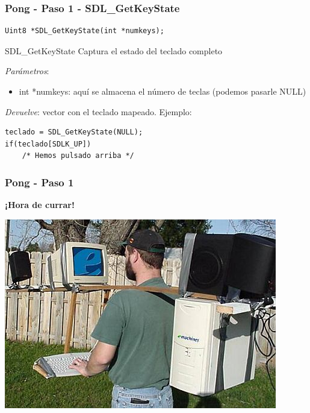 \begin{frame}[fragile]
    \frametitle{Pong - Paso 1 - SDL\_GetKeyState}
	
\begin{verbatim}
Uint8 *SDL_GetKeyState(int *numkeys);
\end{verbatim}

    \begin{block}{SDL\_GetKeyState}
	Captura el estado del teclado completo
	
	\emph{Parámetros}:
	\begin{itemize}
	    \item int *numkeys: aquí se almacena el número de teclas (podemos pasarle NULL)
	\end{itemize}
	
	\emph{Devuelve}: vector con el teclado mapeado.	Ejemplo:
\begin{verbatim}
teclado = SDL_GetKeyState(NULL);
if(teclado[SDLK_UP])
    /* Hemos pulsado arriba */
\end{verbatim}
\end{block}

\end{frame}

\begin{frame}
	\frametitle{Pong - Paso 1}
	
    \begin{center}
        \textbf{¡Hora de currar!}
    \end{center}
	
    \begin{center}
		\includegraphics[scale=0.4]{img/currar-1.jpg}
    \end{center}	

\end{frame}

